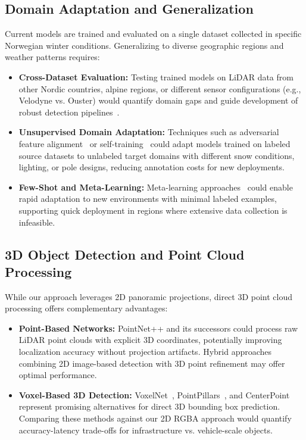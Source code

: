 \documentclass[runningheads]{llncs}
\begin{document}
\subsection{Domain Adaptation and Generalization}

Current models are trained and evaluated on a single dataset collected in specific Norwegian winter conditions. Generalizing to diverse geographic regions and weather patterns requires:

\begin{itemize}
    \item \textbf{Cross-Dataset Evaluation:} Testing trained models on LiDAR data from other Nordic countries, alpine regions, or different sensor configurations (e.g., Velodyne vs. Ouster) would quantify domain gaps and guide development of robust detection pipelines~\cite{wilson2020survey}.
    
    \item \textbf{Unsupervised Domain Adaptation:} Techniques such as adversarial feature alignment~\cite{ganin2015unsupervised} or self-training~\cite{zou2019confidence} could adapt models trained on labeled source datasets to unlabeled target domains with different snow conditions, lighting, or pole designs, reducing annotation costs for new deployments.
    
    \item \textbf{Few-Shot and Meta-Learning:} Meta-learning approaches~\cite{finn2017model} could enable rapid adaptation to new environments with minimal labeled examples, supporting quick deployment in regions where extensive data collection is infeasible.
\end{itemize}

\subsection{3D Object Detection and Point Cloud Processing}

While our approach leverages 2D panoramic projections, direct 3D point cloud processing offers complementary advantages:

\begin{itemize}
    \item \textbf{Point-Based Networks:} PointNet++ and its successors could process raw LiDAR point clouds with explicit 3D coordinates, potentially improving localization accuracy without projection artifacts. Hybrid approaches combining 2D image-based detection with 3D point refinement may offer optimal performance.
    
    \item \textbf{Voxel-Based 3D Detection:} VoxelNet~\cite{zhou2018voxelnet}, PointPillars~\cite{lang2019pointpillars}, and CenterPoint~\cite{yin2021center} represent promising alternatives for direct 3D bounding box prediction. Comparing these methods against our 2D RGBA approach would quantify accuracy-latency trade-offs for infrastructure vs. vehicle-scale objects.
\end{itemize}
\end{document}
